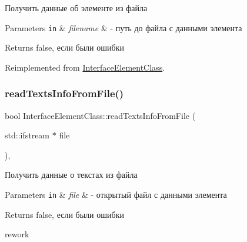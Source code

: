 Получить данные об элементе из файла 


\begin{DoxyParams}[1]{Parameters}
\mbox{\tt in}  & {\em filename} & -\/ путь до файла с данными элемента \\
\hline
\end{DoxyParams}
\begin{DoxyReturn}{Returns}
false, если были ошибки 
\end{DoxyReturn}


Reimplemented from \hyperlink{class_interface_element_class_aadd932731787c60b3f395422188f2f58}{Interface\+Element\+Class}.

\mbox{\label{class_interface_element_class_afc8ee340b6aa0b99e3280b424aa5c519}} 
\subsubsection{\texorpdfstring{read\+Texts\+Info\+From\+File()}{readTextsInfoFromFile()}}
{\footnotesize\ttfamily bool Interface\+Element\+Class\+::read\+Texts\+Info\+From\+File (\begin{DoxyParamCaption}\item[{std\+::ifstream $\ast$}]{file }\end{DoxyParamCaption})\hspace{0.3cm}{\ttfamily [protected]}, {\ttfamily [inherited]}}



Получить данные о текстах из файла 


\begin{DoxyParams}[1]{Parameters}
\mbox{\tt in}  & {\em file} & -\/ открытый файл с данными элемента \\
\hline
\end{DoxyParams}
\begin{DoxyReturn}{Returns}
false, если были ошибки 
\end{DoxyReturn}
rework \mbox{\label{class_group_element_class_ad4ff33d4a63c778c200177dbea7c18ce}} 
